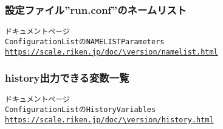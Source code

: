 \subsubsection{設定ファイル''run.conf''のネームリスト} \label{subsubsec:namelist_run}

\begin{alltt}
 \scalerm ドキュメントページ
 Configuration List の NAMELIST Parameters 
 \url{https://scale.riken.jp/doc/\version/namelist.html}
\end{alltt}


\subsubsection{history出力できる変数一覧} \label{subsubsec:histroy_item}

\begin{alltt}
 \scalerm ドキュメントページ
 Configuration List の History Variables
 \url{https://scale.riken.jp/doc/\version/history.html}
\end{alltt}




